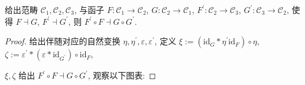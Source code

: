 \begin{lemma}
    \label {lemma:adjoint functor's composition is adjoint}
    给出范畴 \(\mathcal{C}_1, \mathcal{C}_2, \mathcal{C}_3\), 与函子 \(F : \mathcal{C}_1 \to \mathcal{C}_2\), \(G : \mathcal{C}_2 \to \mathcal{C}_1\),
    \(F^\prime : \mathcal{C}_2 \to \mathcal{C}_3\), \(G^\prime : \mathcal{C}_3 \to \mathcal{C}_2\), 使得 \(F \dashv G\), \(F^\prime \dashv G^\prime\),
    则 \(F^\prime \circ F \dashv G \circ G^\prime\).

    \begin{center}
    \end{center}

    \begin{proof}
        给出伴随对应的自然变换 \(\eta, \eta^\prime, \varepsilon, \varepsilon^\prime\),
        定义 \(\xi := (\mathrm{id}_G \ast \eta^\prime \mathrm{id}_{F}) \circ \eta\),
        \(\zeta := \varepsilon^\prime \ast (\varepsilon \ast \mathrm{id}_{G^\prime}) \circ \mathrm{id}_F\),

        \(\xi, \zeta\) 给出 \(F^\prime \circ F \dashv G \circ G^\prime\), 观察以下图表:


\end{proof}
\end{lemma}
